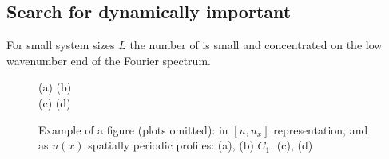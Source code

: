 


\subsection{Search for dynamically important {\eqva} }
\label{sect:sdyneq}

For small system sizes $L$ the number of {\eqva} is small and
concentrated on the low wavenumber end of the Fourier spectrum.

\begin{figure}[tbp] %
    \centering
\hspace{-0.22\textwidth}
\hspace{-0.22\textwidth} (a) \hspace{0.22\textwidth}
\hspace{-0.22\textwidth} (b)
    \\
\hspace{-0.22\textwidth}
\hspace{-0.22\textwidth} (c) \hspace{0.22\textwidth}
\hspace{-0.22\textwidth} (d)
\caption[]{
Example of a figure (plots omitted):
{\Eqva} in
$[u,u_x]$ representation, and as $u(x)$ spatially
periodic profiles:
(a), (b)
    $C_1$.
(c), (d)
      }
\label{f:example}
\end{figure}
